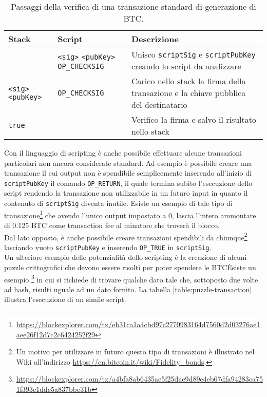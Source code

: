 \begin{table}
  \centering
  \label{table:pay-to-pubkey}
  \begin{tabular}{m{} | m{} | m{}}
    \hline
    Stack&Script&Descrizione \\
    \hline
    \verb||&\verb|<sig>| \verb|<pubKey>| \verb|OP_CHECKSIG|&Unisco \verb|scriptSig| e \verb|scriptPubKey| creando lo script da analizzare  \\ \hline
    \verb|<sig>| \verb|<pubKey>|&\verb|OP_CHECKSIG|&Carico nello stack la firma della transazione e la chiave pubblica del destinatario \\ \hline
    \verb|true|&\verb||&Verifico la firma e salvo il risultato nello stack \\ \hline
  \end{tabular}
  \caption{Passaggi della verifica di una transazione standard di generazione di BTC.}
\end{table}

Con il linguaggio di scripting è anche possibile effettuare alcune transazioni particolari non ancora considerate standard. Ad esempio è possibile creare una transazione il cui output non è spendibile semplicemente inserendo all'inizio di \verb|scriptPubKey| il comando \verb|OP_RETURN|, il quale termina subito l'esecuzione dello script rendendo la transazione non utilizzabile in un futuro input in quanto il contenuto di \verb|scriptSig| diventa inutile. Esiste un esempio di tale tipo di transazione\footnote{\url{https://blockexplorer.com/tx/eb31ca1a4cbd97c2770983164d7560d2d03276ae1aee26f12d7c2c6424252f29}} che avendo l'unico output impostato a 0, lascia l'intero ammontare di 0.125 BTC come transaction fee al minatore che troverà il blocco.\\
Dal lato opposto, è anche possibile creare transazioni spendibili da chiunque\footnote{Un motivo per utilizzare in futuro questo tipo di transazioni è illustrato nel Wiki all'indirizzo \url{https://en.bitcoin.it/wiki/Fidelity_bonds}.} lasciando vuoto \verb|scriptPubKey| e inserendo \verb|OP_TRUE| in \verb|scriptSig|.\\
Un ulteriore esempio delle potenzialità dello scripting è la creazione di alcuni puzzle crittografici che devono essere risolti per poter spendere le BTC\. Esiste un esempio \footnote{\url{https://blockexplorer.com/tx/a4bfa8ab6435ae5f25dae9d89e4eb67dfa94283ca751f393c1ddc5a837bbc31b}} in cui si richiede di trovare qualche dato tale che, sottoposto due volte ad hash, risulti uguale ad un dato fornito. La tabella \ref{table:puzzle-transaction} illustra l'esecuzione di un simile script.

